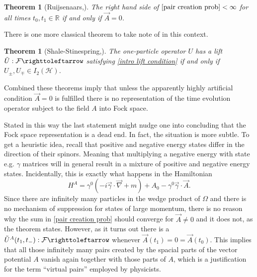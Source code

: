 \documentclass[b5paper,draft,openbib,12pt]{memoir}
\newtheorem{Thm}[Def]{Theorem}
\begin{document}
\begin{Thm}[Ruijsenaars,\cite{ruijsenaars1977charged}]\label{thm ruisnaar}
The right hand side of \(\eqref{pair creation prob}<\infty\)
for all times \(t_0,t_1\in\mathbb{R}\)
if and only if \(\vec{A}=0\).
\end{Thm}

There is one more classical theorem to take note of in this context.

\begin{Thm}[Shale-Stinespring,\cite{shale1965spinor}]\label{thm shale stinepsirng}
The one-particle operator \(U\) has a lift 
\(\tilde{U}:\mathcal{F}\righttoleftarrow\) satisfying 
\eqref{intro lift condition} if and only if 
\(U_{\pm}, U_{\mp}\in I_2(\mathcal{H})\). 
\end{Thm}

Combined these theorems imply that unless the apparently
highly artificial condition \(\vec{A}=0\) is 
fulfilled there is no representation of the time evolution 
operator subject to the field \(A\) into Fock space. 

Stated in this way the last statement might nudge one
into concluding that the Fock space representation 
is a dead end. In fact, the situation is more subtle. 
To get a heuristic idea, recall that positive and negative 
energy states differ in the direction of their spinors. 
Meaning that multiplying a negative energy  with state
e.g. \(\gamma\) matrices will in general result in 
a mixture of positive and negative energy states. 
Incidentally, this is exactly what happens in the Hamiltonian 
\begin{equation}
H^A=\gamma^0(-i\vec{\gamma}\cdot \vec{\nabla} +m) + A_0 -\gamma^0\vec{\gamma}\cdot\vec{A}.
\end{equation}
Since there are infinitely many particles in the wedge 
product of \(\Omega\) and there is no mechanism of suppression 
for states of large momentum, there is no reason why the sum in 
\eqref{pair creation prob} should converge for \(\vec{A}\neq 0\)
and it does not, as the theorem states. However, as it turns out
there is a \(\tilde{U}^A(t_1,t_-):\mathcal{F}\righttoleftarrow\)
whenever \(\vec{A}(t_1)=0=\vec{A}(t_0)\). This implies 
that all those 
infinitely many pairs created by the spacial parts of the 
vector potential \(A\) vanish again together with those parts of 
\(A\), which is a justification for the term ``virtual pairs''
employed by physicists. 
\end{document}
